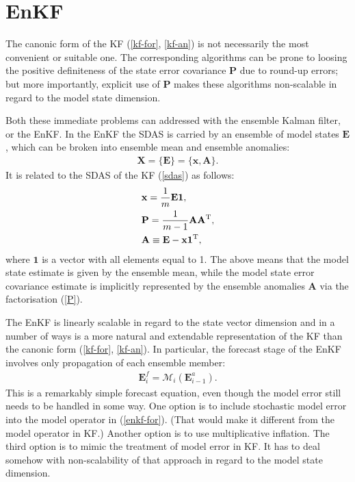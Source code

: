 \documentclass[11pt]{report}
\newcommand{\mb} {\mathbf}
\newcommand{\T}{^{\tiny \mathrm T}}
\begin{document}
\section{EnKF}

The canonic form of the KF (\ref{kf-for}, \ref{kf-an}) is not necessarily the most convenient or suitable one.
The corresponding algorithms can be prone to loosing the positive definiteness of the state error covariance $\mb P$ due to round-up errors; but more importantly, explicit use of $\mb P$ makes these algorithms non-scalable in regard to the model state dimension.

Both these immediate problems can addressed with the ensemble Kalman filter, or the EnKF.
In the EnKF the SDAS is carried by an ensemble of model states $\mb E$, which can be broken into ensemble mean and ensemble anomalies:
\begin{align}
  \label{sdas-enkf}
  \mb X = \{\mb E\} = \{\mb x, \mb A\}.
\end{align}
It is related to the SDAS of the KF (\ref{sdas}) as follows:
\begin{subequations}
  \label{E}
  \begin{align}
    \label{x}
    &\mb x = \frac{1}{m} \mb E \mb 1,\\
    \label{P}
    &\mb P = \frac{1}{m - 1} \mb A \mb A\T,\\
    \label{A}
    &\mb A \equiv \mb E - \mb x \mb 1\T,
  \end{align}
\end{subequations}
where $\mb 1$ is a vector with all elements equal to 1.
The above means that the model state estimate is given by the ensemble mean, while the model state error covariance estimate is implicitly represented by the ensemble anomalies $\mb A$ via the factorisation (\ref{P}).

The EnKF is linearly scalable in regard to the state vector dimension and in a number of ways is a more natural and extendable representation of the KF than the canonic form (\ref{kf-for}, \ref{kf-an}).
In particular, the forecast stage of the EnKF involves only propagation of each ensemble member:
\begin{align}
  \label{enkf-for}
  \mb E_i^f = \mathcal M_i(\mb E_{i-1}^a).
\end{align}
This is a remarkably simple forecast equation, even though the model error still needs to be handled in some way.
One option is to include stochastic model error into the model operator in (\ref{enkf-for}).
(That would make it different from the model operator in KF.)
Another option is to use multiplicative inflation.
The third option is to mimic the treatment of model error in KF.
It has to deal somehow with non-scalability of that approach in regard to the model state dimension.
\end{document}

